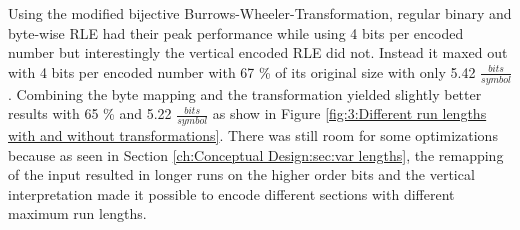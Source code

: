 \par{
Using the modified bijective Burrows-Wheeler-Transformation, regular binary and byte-wise RLE had their peak performance while using 4 bits per encoded number but interestingly the vertical encoded RLE did not. Instead it maxed out with 4 bits per encoded number with 67 \% of its original size with only 5.42 $\frac{bits}{symbol}$. Combining the byte mapping and the transformation yielded slightly better results with 65 \% and 5.22 $\frac{bits}{symbol}$ as show in Figure \ref{fig:3:Different run lengths with and without transformations}. There was still room for some optimizations because as seen in Section \ref{ch:Conceptual Design:sec:var lengths}, the remapping of the input resulted in longer runs on the higher order bits and the vertical interpretation made it possible to encode different sections with different maximum run lengths.

}
